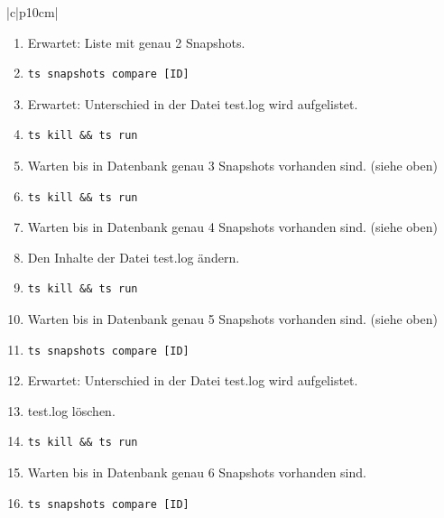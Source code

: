 \documentclass[a4paper,12pt]{report}
\begin{document}
\begin{table}[h!]
\begin{tabular}{|c|p{10cm}|}
\begin{enumerate}
\begin{verbatim}
                \end{verbatim}
                \item Erwartet: Liste mit genau 2 Snapshots.
                \item \begin{verbatim}ts snapshots compare [ID]
                \end{verbatim}
                \item Erwartet: Unterschied in der Datei test.log wird aufgelistet.
                \item \begin{verbatim}ts kill && ts run
                \end{verbatim}
                \item Warten bis in Datenbank genau 3 Snapshots vorhanden sind.
                (siehe oben)
                \item \begin{verbatim}ts kill && ts run
                \end{verbatim}
                \item Warten bis in Datenbank genau 4 Snapshots vorhanden sind.
                (siehe oben)
                \item Den Inhalte der Datei test.log ändern.
                \item \begin{verbatim}ts kill && ts run
                \end{verbatim}
                \item Warten bis in Datenbank genau 5 Snapshots vorhanden sind.
                (siehe oben)
                \item \begin{verbatim}ts snapshots compare [ID]
                \end{verbatim}
                \item Erwartet: Unterschied in der Datei test.log wird aufgelistet.
                \item test.log löschen.
                \item \begin{verbatim}ts kill && ts run
                \end{verbatim}
                \item Warten bis in Datenbank genau 6 Snapshots vorhanden sind.
                \item \begin{verbatim}ts snapshots compare [ID]
                \end{verbatim}

\end{enumerate}
\end{tabular}
\end{table}
\end{document}
